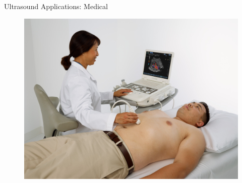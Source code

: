 \begin{frame}{Ultrasound Applications: Medical}
    \begin{figure}
        \centering
        \includegraphics[height=0.8\textheight]{images/SH_US_35403_12.jpg}\\
    \end{figure}
\end{frame}


